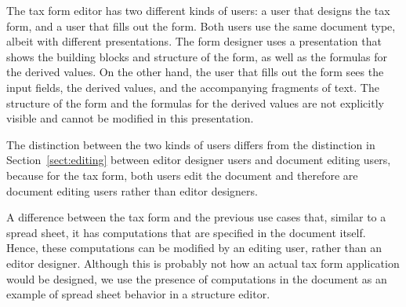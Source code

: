 

The tax form editor has two different kinds of users: a user that designs the tax form, and a user that fills out the form. Both users use the same document type, albeit with different presentations. The form designer uses a presentation that shows the building blocks and structure of the form, as well as the formulas for the derived values. On the other hand, the user that fills out the form sees the input fields, the derived values, and the accompanying fragments of text. The structure of the form and the formulas for the derived values are not explicitly visible and cannot be modified in this presentation.

The distinction between the two kinds of users differs from the distinction in Section~\ref{sect:editing} between editor designer users and  document editing users, because for the tax form, both users edit the document and therefore are document editing users rather than editor designers.

A difference between the tax form and the previous use cases that, similar to a spread sheet, it has computations that are specified in the document itself. Hence, these computations can be modified by an editing user, rather than an editor designer. Although this is probably not how an actual tax form application would be designed, we use the presence of computations in the document as an example of spread sheet behavior in a structure editor.



